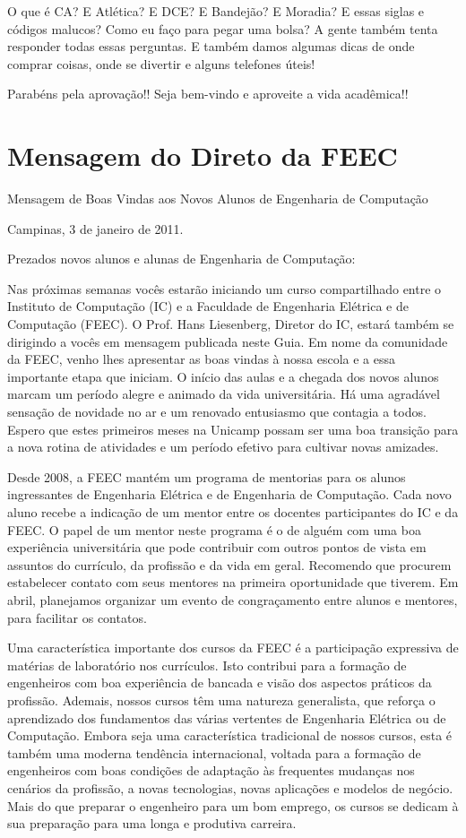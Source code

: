 \documentclass[a4paper,10pt]{article}
\begin{document}
O que é CA? E Atlética? E DCE? E Bandejão? E Moradia? E essas siglas e códigos
malucos? Como eu faço para pegar uma bolsa? A gente também tenta responder todas
essas perguntas. E também damos algumas dicas de onde comprar coisas, onde se
divertir e alguns telefones úteis!

Parabéns pela aprovação!! Seja bem-vindo e aproveite a vida acadêmica!!

\section{Mensagem do Direto da FEEC}
Mensagem de Boas Vindas aos Novos Alunos de Engenharia de Computação

Campinas, 3 de janeiro de 2011.

Prezados novos alunos e alunas de Engenharia de Computação:

Nas próximas semanas vocês estarão iniciando um curso compartilhado entre
o Instituto de Computação (IC) e a Faculdade de Engenharia Elétrica e de
Computação (FEEC). O Prof. Hans Liesenberg, Diretor do IC, estará também se
dirigindo a vocês em mensagem publicada neste Guia. Em nome da comunidade da
FEEC, venho lhes apresentar as boas vindas à nossa escola e a essa importante
etapa que iniciam. O início das aulas e a chegada dos novos alunos marcam um
período alegre e animado da vida universitária. Há uma agradável sensação de
novidade no ar e um renovado entusiasmo que contagia a todos. Espero que estes
primeiros meses na Unicamp possam ser uma boa transição para a nova rotina de
atividades e um período efetivo para cultivar novas amizades.  

Desde 2008, a FEEC mantém um programa de mentorias para os alunos ingressantes
de Engenharia Elétrica e de Engenharia de Computação. Cada novo aluno recebe
a indicação de um mentor entre os docentes participantes do IC e da FEEC.
O papel de um mentor neste programa é o de alguém com uma boa experiência
universitária que pode contribuir com outros pontos de vista em assuntos do
currículo, da profissão e da vida em geral. Recomendo que procurem estabelecer
contato com seus mentores na primeira oportunidade que tiverem. Em abril,
planejamos organizar um evento de congraçamento entre alunos e mentores, para
facilitar os contatos.

Uma característica importante dos cursos da FEEC é a participação expressiva de
matérias de laboratório nos currículos. Isto contribui para a formação de
engenheiros com boa experiência de bancada e visão dos aspectos práticos da
profissão. Ademais, nossos cursos têm uma natureza generalista, que reforça
o aprendizado dos fundamentos das várias vertentes de Engenharia Elétrica ou de
Computação. Embora seja uma característica tradicional de nossos cursos, esta
é também uma moderna tendência internacional, voltada para a formação de
engenheiros com boas condições de adaptação às frequentes mudanças nos cenários
da profissão, a novas tecnologias, novas aplicações e modelos de negócio. Mais
do que preparar o engenheiro para um bom emprego, os cursos se dedicam à sua
preparação para uma longa e produtiva carreira.
\end{document}
